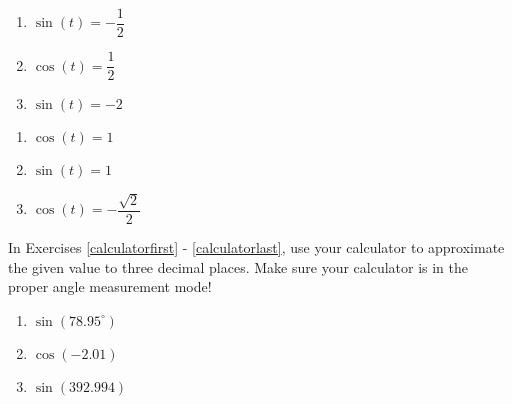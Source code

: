\begin{multicols}{3}

\begin{enumerate}

\setcounter{enumi}{\value{HW}}

\item $\sin(t) = -\dfrac{1}{2}$
\item $\cos(t) = \dfrac{1}{2}$
\item $\sin(t) = -2$ 

\setcounter{HW}{\value{enumi}}

\end{enumerate}

\end{multicols}

\begin{multicols}{3}

\begin{enumerate}

\setcounter{enumi}{\value{HW}}

\item $\cos(t) = 1$ 
\item $\sin(t) = 1$ 
\item $\cos(t) = -\dfrac{\sqrt{2}}{2}$ \label{solvefortlast}

\setcounter{HW}{\value{enumi}}

\end{enumerate}

\end{multicols}

In Exercises \ref{calculatorfirst} - \ref{calculatorlast}, use your calculator to approximate the given value to three decimal places.  Make sure your calculator is in the proper angle measurement mode!

\begin{multicols}{3}

\begin{enumerate}

\setcounter{enumi}{\value{HW}}

\item $\sin(78.95^{\circ})$ \label{calculatorfirst}
\item $\cos(-2.01)$
\item $\sin(392.994)$

\setcounter{HW}{\value{enumi}}

\end{enumerate}

\end{multicols}

